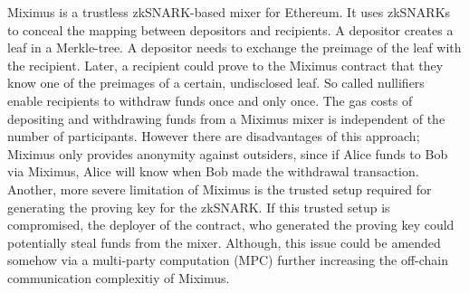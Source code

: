 \documentclass[a4paper]{article}
\theoremstyle{definition}
\begin{document}
Miximus is a trustless zkSNARK-based mixer for Ethereum\cite{miximus2018}. It uses zkSNARKs to conceal the mapping between depositors and recipients. A depositor creates a leaf in a Merkle-tree. A depositor needs to exchange the preimage of the leaf with the recipient. Later, a recipient could prove to the Miximus contract that they know one of the preimages of a certain, undisclosed leaf. So called nullifiers enable recipients to withdraw funds once and only once. The gas costs of depositing and withdrawing funds from a Miximus mixer is independent of the number of participants. However there are disadvantages of this approach; Miximus only provides anonymity against outsiders, since if Alice funds to Bob via Miximus, Alice will know when Bob made the withdrawal transaction. Another, more severe limitation of Miximus is the trusted setup required for generating the proving key for the zkSNARK. If this trusted setup is compromised, the deployer of the contract, who generated the proving key could potentially steal funds from the mixer. Although, this issue could be amended somehow via a multi-party computation (MPC) further increasing the off-chain communication complexitiy of Miximus.
\end{document}
